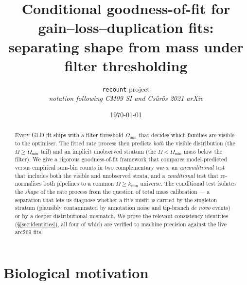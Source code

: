 \documentclass[11pt]{article}
\title{Conditional goodness-of-fit for gain--loss--duplication fits:\\
       separating shape from mass under filter thresholding}
\author{\texttt{recount} project\\
        \textit{notation following CM09 SI and Cs\H{u}r\"os 2021 arXiv}}
\date{\today}
\newcommand{\1}{\mathbf{1}}
\newcommand{\Om}{\Omega}
\theoremstyle{definition}
\begin{document}
\maketitle

\begin{center}
\end{center}

\begin{abstract}
Every GLD fit ships with a filter threshold $\Om_{\min}$ that decides
which families are visible to the optimiser. The fitted rate process
then predicts \emph{both} the visible distribution (the
$\Om \ge \Om_{\min}$ tail) and an implicit unobserved stratum
(the $\Om < \Om_{\min}$ mass below the filter). We give a rigorous
goodness-of-fit framework that compares model-predicted versus
empirical sum-bin counts in two complementary ways: an
\emph{unconditional} test that includes both the visible and
unobserved strata, and a \emph{conditional} test that re-normalises
both pipelines to a common $\Om\ge k_{\min}$ universe. The conditional
test isolates the \emph{shape} of the rate process from the question
of total mass calibration --- a separation that lets us diagnose
whether a fit's misfit is carried by the singleton stratum
(plausibly contaminated by annotation noise and tip-branch
\emph{de novo} events) or by a deeper distributional mismatch.
We prove the relevant consistency identities
(\S\ref{sec:identities}), all four of which are verified to
machine precision against the live arc269 fits.
\end{abstract}

\section{Biological motivation}
\label{sec:bio-motivation}
\end{document}
